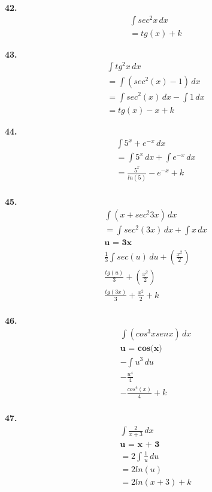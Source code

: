 \documentclass{article}
\begin{document}
\textbf{42.}
\begin{gather*}
    \int sec^2 x \,dx
\\
    = tg(x) + k
\end{gather*}

\textbf{43.}
\begin{gather*}
    \int tg^2 x \,dx
\\
    = \int (sec^2(x)-1)\,dx
\\ 
    = \int sec^2(x)\,dx - \int 1\,dx
\\
    = tg(x) - x + k
\end{gather*}

\textbf{44.}
\begin{gather*}
    \int 5^x + e^{-x} \,dx
\\
    = \int 5^x\,dx + \int e^{-x}\,dx
\\ 
    = \frac{5^x}{ln(5)} - e^{-x} + k
\\
\end{gather*}

\textbf{45.}
\begin{gather*}
    \int (x + sec^2 3x) \,dx
\\
    = \int sec^2(3x) \,dx + \int x \,dx
\\
    \textbf{u = 3x}
\\
    \frac{1}{3}\int sec(u) \,du + (\frac{x^2}{2})
\\
    \frac{tg(u)}{3} + (\frac{x^2}{2})
\\
    \frac{tg(3x)}{3} + \frac{x^2}{2} + k
\\
\end{gather*}

\textbf{46.}
\begin{gather*}
    \int (cos^3x senx) \,dx
\\
    \textbf{u = cos(x)}
\\
    -\int u^3 \,du
\\
    -\frac{u^4}{4}
\\
    -\frac{cos^4(x)}{4} + k
\\
\end{gather*}

\textbf{47.}
\begin{gather*}
    \int \frac{2}{x+3} \,dx
\\
    \textbf{u = x + 3}
\\
    = 2\int \frac{1}{u}\,du
\\
    = 2ln(u)
\\
    = 2ln(x + 3) + k
\\
\end{gather*}
\end{document}
